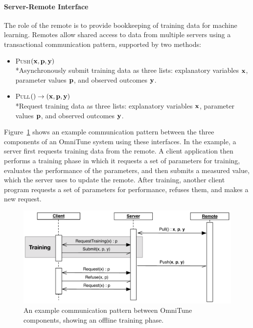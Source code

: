 \documentclass[nonatbib,preprint,9pt]{sigplanconf}
\begin{document}
\paragraph{Server-Remote Interface} The role of the remote is to
provide bookkeeping of training data for machine learning. Remotes
allow shared access to data from multiple servers using a
transactional communication pattern, supported by two methods:
%
\begin{itemize}
\item \textsc{Push}$(\bf{x}, \bf{p}, \bf{y})$\\*Asynchronously submit
  training data as three lists: explanatory variables $\bf{x}$,
  parameter values $\bf{p}$, and observed outcomes $\bf{y}$.
\item \textsc{Pull}$() \to (\bf{x}, \bf{p}, \bf{y})$\\*Request
  training data as three lists: explanatory variables $\bf{x}$,
  parameter values $\bf{p}$, and observed outcomes $\bf{y}$.
\end{itemize}
%
Figure~\ref{fig:omnitune-comms} shows an example communication pattern
between the three components of an OmniTune system using these
interfaces. In the example, a server first requests training data from
the remote. A client application then performs a training phase in
which it requests a set of parameters for training, evaluates the
performance of the parameters, and then submits a measured value,
which the server uses to update the remote. After training, another
client program requests a set of parameters for performance, refuses
them, and makes a new request.

\begin{figure}
\centering
\includegraphics[width=1.0\columnwidth]{img/omnitune-comms}
\caption{%
  An example communication pattern between OmniTune components,
  showing an offline training phase.%
}
\label{fig:omnitune-comms}
\end{figure}
\end{document}
